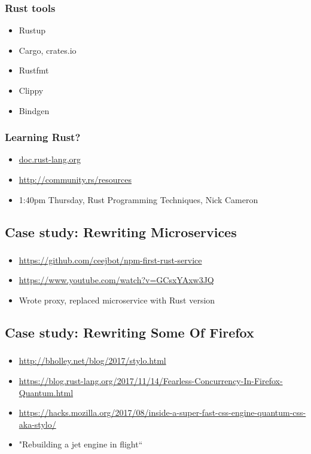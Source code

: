 \documentclass{beamer}
\begin{document}
\begin{frame}[fragile]
\frametitle{Rust tools}
\begin{itemize}
\item Rustup
\item Cargo, crates.io
\item Rustfmt
\item Clippy
\item Bindgen
\end{itemize}
\end{frame}

\begin{frame}[fragile]
\frametitle{Learning Rust?}
\begin{itemize}
\item \url{doc.rust-lang.org}
\item \url{http://community.rs/resources}
\item 1:40pm Thursday, Rust Programming Techniques, Nick Cameron
\end{itemize}
\end{frame}

\subsection{Case study: Rewriting Microservices}

\begin{frame}[fragile]
\frametitle{\insertsubsectionhead}
\begin{itemize}
\item \url{https://github.com/ceejbot/npm-first-rust-service}
\item \url{https://www.youtube.com/watch?v=GCsxYAxw3JQ}
\item Wrote proxy, replaced microservice with Rust version
\end{itemize}
\end{frame}

\subsection{Case study: Rewriting Some Of Firefox}

\begin{frame}[fragile]
\frametitle{\insertsubsectionhead}
\begin{itemize}
\item \url{http://bholley.net/blog/2017/stylo.html}
\item \url{https://blog.rust-lang.org/2017/11/14/Fearless-Concurrency-In-Firefox-Quantum.html}
\item \url{https://hacks.mozilla.org/2017/08/inside-a-super-fast-css-engine-quantum-css-aka-stylo/}
\item "Rebuilding a jet engine in flight``
\end{itemize}
\end{frame}
\end{document}
